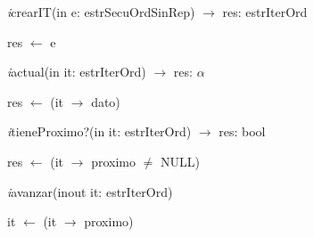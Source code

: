 \textit{i}crearIT(in e: estrSecuOrdSinRep) $\longrightarrow$ res: estrIterOrd\\
\begin{algorithm}[H]
res $\leftarrow$ e
\end{algorithm}

\textit{i}actual(in it: estrIterOrd) $\longrightarrow$ res: $\alpha$\\
\begin{algorithm}[H]
res $\leftarrow$ (it $\rightarrow$ dato)
\end{algorithm}

\textit{i}tieneProximo?(in it: estrIterOrd) $\longrightarrow$ res: bool\\
\begin{algorithm}[H]
res $\leftarrow$ (it $\rightarrow$ proximo $\neq$ NULL)
\end{algorithm}

\textit{i}avanzar(inout it: estrIterOrd)\\
\begin{algorithm}[H]
it $\leftarrow$ (it $\rightarrow$ proximo)
\end{algorithm}
